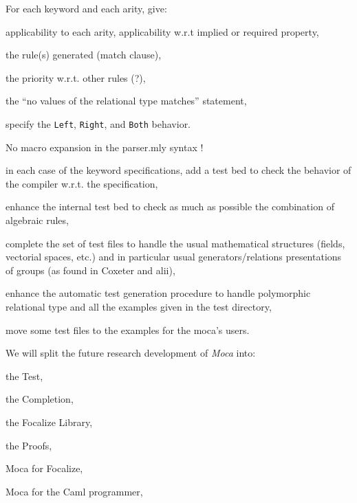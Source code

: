 

For each keyword and each arity, give:

\begin{citemize}
  \item applicability to each arity, applicability w.r.t implied or required property,
  \item the rule(s) generated (match clause),
  \item the priority w.r.t. other rules (?),
  \item the ``no values of the relational type matches'' statement,
  \item specify the {\tt Left}, {\tt Right}, and {\tt Both} behavior.
\end{citemize}

No macro expansion in the parser.mly syntax !



\begin{citemize}
  \item in each case of the keyword specifications, add a test bed to check
  the behavior of the compiler w.r.t. the specification,
  \item enhance the internal test bed to check as much as possible
  the combination of algebraic rules,
  \item complete the set of test files to handle the usual mathematical
  structures (fields, vectorial spaces, etc.) and in particular usual
  generators/relations presentations of groups (as found in Coxeter and alii),
  \item enhance the automatic test generation procedure to handle polymorphic
  relational type and all the examples given in the test directory,
  \item move some test files to the examples for the moca's users.
\end{citemize}



We will split the future research development of {\em Moca} into:

\begin{citemize}
  \item the Test,
  \item the Completion,
  \item the Focalize Library,
  \item the Proofs,
  \item Moca for Focalize,
  \item Moca for the Caml programmer,
\end{citemize}


